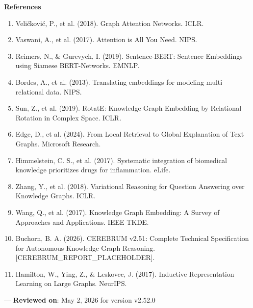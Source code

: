 \textbf{References}
\begin{enumerate}
\item Veličković, P., et al. (2018). Graph Attention Networks. ICLR.
\item Vaswani, A., et al. (2017). Attention is All You Need. NIPS.
\item Reimers, N., \& Gurevych, I. (2019). Sentence-BERT: Sentence Embeddings using Siamese BERT-Networks. EMNLP.
\item Bordes, A., et al. (2013). Translating embeddings for modeling multi-relational data. NIPS.
\item Sun, Z., et al. (2019). RotatE: Knowledge Graph Embedding by Relational Rotation in Complex Space. ICLR.
\item Edge, D., et al. (2024). From Local Retrieval to Global Explanation of Text Graphs. Microsoft Research.
\item Himmelstein, C. S., et al. (2017). Systematic integration of biomedical knowledge prioritizes drugs for infla\-mmation. eLife.
\item Zhang, Y., et al. (2018). Variational Reasoning for Question Answering over Knowledge Graphs. ICLR.
\item Wang, Q., et al. (2017). Knowledge Graph Embedding: A Survey of Approaches and Applic\-ations. IEEE TKDE.
\item Buchorn, B. A. (2026). CEREBRUM v2.51: Complete Technical Specif\-ication for Autonomous Knowledge Graph Reasoning. [CEREBRUM\_REPORT\_PLACEHOLDER].
\item Hamilton, W., Ying, Z., \& Leskovec, J. (2017). Inductive Repres\-entation Learning on Large Graphs. NeurIPS.

\end{enumerate}
---
\textbf{Reviewed on}: May 2, 2026 for version v2.52.0
